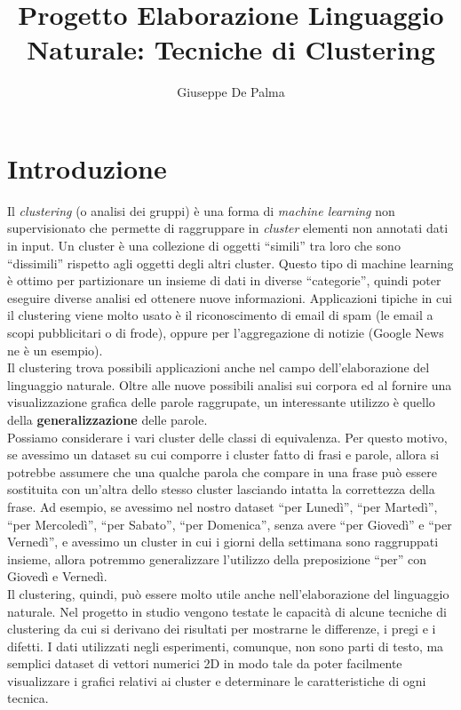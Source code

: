 \documentclass{llncs}
\author{Giuseppe De Palma}
\title{Progetto Elaborazione Linguaggio Naturale: Tecniche di Clustering}
\institute{Alma Mater Studiorum - Università di Bologna \\
	\email{giuseppe.depalma@studio.unibo.it}\\
	\email{Matricola: 854846}
}
\newcommand{\acapo}{\vspace{0.5\baselineskip}\\}
\begin{document}
    \maketitle
		   
	\section{Introduzione}
	Il \textit{clustering} (o analisi dei gruppi) è una forma di \textit{machine learning} non supervisionato che permette di raggruppare in \textit{cluster} elementi non annotati
	dati in input. Un cluster è una collezione di oggetti ``simili'' tra loro che sono ``dissimili'' rispetto agli oggetti degli altri cluster. Questo tipo di machine learning è
	ottimo per partizionare un insieme di dati in diverse ``categorie'', quindi poter eseguire diverse analisi ed ottenere nuove informazioni.
	Applicazioni tipiche in cui il clustering viene molto usato è il riconoscimento di email di spam (le email a scopi pubblicitari o di frode), oppure per l'aggregazione di notizie (Google News ne è un esempio).
	\acapo
	Il clustering trova possibili applicazioni anche nel campo dell'elaborazione del linguaggio naturale. Oltre alle nuove possibili analisi
	sui corpora ed al fornire una visualizzazione grafica delle parole raggrupate, un interessante utilizzo è quello della \textbf{generalizzazione} delle parole.
	\acapo 
	Possiamo considerare i vari cluster delle classi di equivalenza. Per questo motivo, se avessimo un dataset su cui comporre i cluster fatto di frasi e parole, allora si potrebbe assumere che una
	qualche parola che compare in una frase può essere sostituita con un'altra dello stesso cluster lasciando intatta la correttezza della frase. 
	Ad esempio, se avessimo nel nostro dataset ``per Lunedì'', ``per Martedì'', ``per Mercoledì'', ``per Sabato'', ``per Domenica'', senza avere ``per Giovedì'' e ``per Vernedì'', e avessimo un cluster in cui 
	i giorni della settimana sono raggruppati insieme, allora potremmo generalizzare l'utilizzo della preposizione ``per'' con Giovedì e Vernedì.
	\acapo
	Il clustering, quindi, può essere molto utile anche nell'elaborazione del linguaggio naturale. Nel progetto in studio vengono testate le capacità di alcune tecniche di clustering
	da cui si derivano dei risultati per mostrarne le differenze, i pregi e i difetti. I dati utilizzati negli esperimenti, comunque, non sono parti di testo, ma semplici dataset di vettori numerici 2D in modo tale da poter facilmente 
	visualizzare i grafici relativi ai cluster e determinare le caratteristiche di ogni tecnica.
\end{document}
